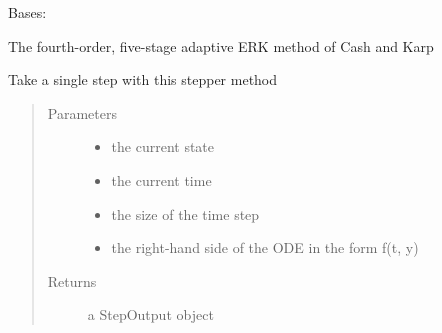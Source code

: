 \documentclass[letterpaper,10pt,english]{sphinxmanual}
\begin{document}

\begin{fulllineitems}
\label{\detokenize{spitfire.time.methods:spitfire.time.methods.AdaptiveERK54CashKarp}}
Bases: {\hyperref[\detokenize{spitfire.time.methods:spitfire.time.methods.AdaptiveExplicitRungeKutta}]{}}

The fourth-order, five-stage adaptive ERK method of Cash and Karp

\begin{fulllineitems}
\label{\detokenize{spitfire.time.methods:spitfire.time.methods.AdaptiveERK54CashKarp.single_step}}
Take a single step with this stepper method
\begin{quote}\begin{description}
\item[{Parameters}] \leavevmode\begin{itemize}
\item {} 
 \textendash{} the current state

\item {} 
 \textendash{} the current time

\item {} 
 \textendash{} the size of the time step

\item {} 
 \textendash{} the right-hand side of the ODE in the form f(t, y)

\end{itemize}

\item[{Returns}] \leavevmode
a StepOutput object

\end{description}\end{quote}

\end{fulllineitems}


\end{fulllineitems}
\end{document}

